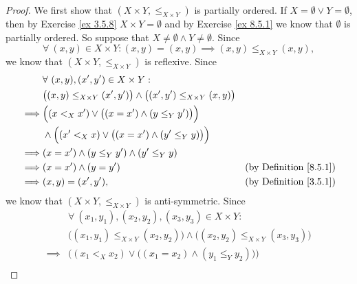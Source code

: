 \begin{proof}
    We first show that \((X \times Y, \leq_{X \times Y})\) is partially ordered.
    If \(X = \emptyset \lor Y = \emptyset\), then by Exercise \ref{ex 3.5.8} \(X \times Y = \emptyset\) and by Exercise \ref{ex 8.5.1} we know that \(\emptyset\) is partially ordered.
    So suppose that \(X \neq \emptyset \land Y \neq \emptyset\).
    Since
    \[
        \forall\ (x, y) \in X \times Y : (x, y) = (x, y) \implies (x, y) \leq_{X \times Y} (x, y),
    \]
    we know that \((X \times Y, \leq_{X \times Y})\) is reflexive.
    Since
    \begin{align*}
                 & \forall\ (x, y), (x', y') \in X \times Y :                                                                                         \\
                 & \big((x, y) \leq_{X \times Y} (x', y')\big) \land \big((x', y') \leq_{X \times Y} (x, y)\big)                                      \\
        \implies & \Big((x <_X x') \lor \big((x = x') \land (y \leq_Y y')\big)\Big)                                                                   \\
                 & \land \Big((x' <_X x) \lor \big((x = x') \land (y' \leq_Y y)\big)\Big)                                                             \\
        \implies & (x = x') \land (y \leq_Y y') \land (y' \leq_Y y)                                                                                   \\
        \implies & (x = x') \land (y = y')                                                                       & \text{(by Definition \ref{8.5.1})} \\
        \implies & (x, y) = (x', y'),                                                                            & \text{(by Definition \ref{3.5.1})}
    \end{align*}
    we know that \((X \times Y, \leq_{X \times Y})\) is anti-symmetric.
    Since
    \begin{align*}
                 & \forall\ (x_1, y_1), (x_2, y_2), (x_3, y_3) \in X \times Y :                                                                                   \\
                 & \big((x_1, y_1) \leq_{X \times Y} (x_2, y_2)\big) \land \big((x_2, y_2) \leq_{X \times Y} (x_3, y_3)\big)                                      \\
        \implies & \Big((x_1 <_X x_2) \lor \big((x_1 = x_2) \land (y_1 \leq_Y y_2)\big)\Big)                                                                      \\

\end{align*}
\end{proof}
